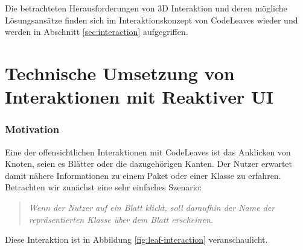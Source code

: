 Die betrachteten Herausforderungen von 3D Interaktion und deren mögliche Lösungsansätze finden sich im Interaktionskonzept von CodeLeaves wieder und werden in Abschnitt \ref{sec:interaction} aufgegriffen.

\section{Technische Umsetzung von Interaktionen mit Reaktiver UI}

\subsubsection*{Motivation}
Eine der offensichtlichen Interaktionen mit CodeLeaves ist das Anklicken von Knoten, seien es Blätter oder die dazugehörigen Kanten. Der Nutzer erwartet damit nähere Informationen zu einem Paket oder einer Klasse zu erfahren. Betrachten wir zunächst eine sehr einfaches Szenario:

\begin{quotation}
  \textit{Wenn der Nutzer auf ein Blatt klickt, soll daraufhin der Name der repräsentierten Klasse über dem Blatt erscheinen.}
\end{quotation}

Diese Interaktion ist in Abbildung \ref{fig:leaf-interaction} veranschaulicht.

